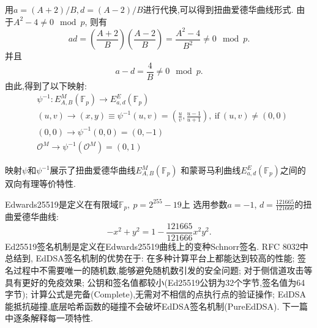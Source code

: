 \documentclass{article}
\newcommand{\F}{\mathbb{F}}
\begin{document}
用$a = (A+2)/B, d = (A-2)/B$进行代换,可以得到扭曲爱德华曲线形式. 
由于$A^2-4\neq0\mod p$, 则有
$$ad = \left(\frac{A+2}{B}\right)\left(\frac{A-2}{B}\right) = \frac{A^2-4}{B^2}\neq 0\mod p.$$
并且
$$a-d = \frac{4}{B} \neq 0 \mod p.$$
由此,得到了以下映射:
\begin{equation*}
\begin{array}{cc}
& \psi^{-1}: E_{A,B}^M(\F_p) \rightarrow   E_{a,d}^E(\F_p)\\
& (u,v) \rightarrow (x,y) \equiv \psi^{-1}(u, v) = \left( \frac{u}{v}, \frac{u-1}{u+1} \right),\ \text{if}\ (u,v)\neq(0,0)\\
& (0,0) \rightarrow \psi^{-1}(0,0) = (0, -1) \\
& \mathcal{O}^M \rightarrow \psi^{-1}(\mathcal{O}^M) = (0,1)
\end{array}
\end{equation*}

映射$\psi$和$\psi^{-1}$展示了扭曲爱德华曲线$E_{A,B}^M(\F_p)$
和蒙哥马利曲线$ E_{a,d}^E(\F_p)$之间的双向有理等价特性.

Edwards25519是定义在有限域$\F_p, \ p = 2^{255}-19$上
选用参数$a=-1$, $d = \frac{121665}{121666}$的扭曲爱德华曲线:
$$-x^2 + y^2 = 1 - \frac{121665}{121666}x^2y^2.$$
Ed25519签名机制是定义在Edwards25519曲线上的变种Schnorr签名.
RFC 8032中总结到, EdDSA签名机制的优势在于: 在多种计算平台上都能达到较高的性能;
签名过程中不需要唯一的随机数,能够避免随机数引发的安全问题; 
对于侧信道攻击等具有更好的免疫效果; 公钥和签名值都较小(Ed25519公钥为32个字节,签名值为64字节);
计算公式是完备(Complete),无需对不相信的点执行点的验证操作;
EdDSA能抵抗碰撞,底层哈希函数的碰撞不会破坏EdDSA签名机制(PureEdDSA).
下一篇中逐条解释每一项特性.
\end{document}
